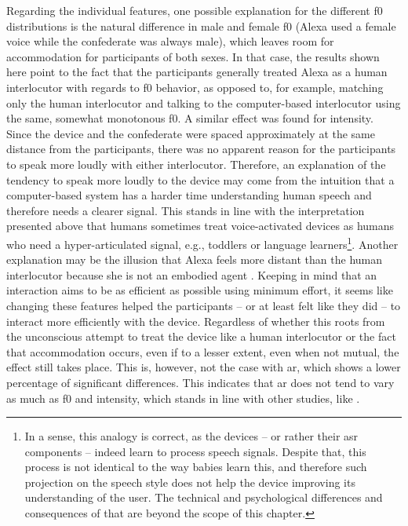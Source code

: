 Regarding the individual features, one possible explanation for the different \ac{f0} distributions is the natural difference in male and female \ac{f0} (Alexa used a female voice while the confederate was always male), which leaves room for accommodation for participants of both sexes.
In that case, the results shown here point to the fact that the participants generally treated Alexa as a human interlocutor with regards to \ac{f0} behavior, as opposed to, for example, matching only the human interlocutor and talking to the computer-based interlocutor using the same, somewhat monotonous \ac{f0}.
A similar effect was found for intensity.
Since the device and the confederate were spaced approximately at the same distance from the participants, there was no apparent reason for the participants to speak more loudly with either interlocutor.
Therefore, an explanation of the tendency to speak more loudly to the device may come from the intuition that a computer-based system has a harder time understanding human speech and therefore needs a clearer signal.
This stands in line with the interpretation presented above that humans sometimes treat voice-activated devices as humans who need a hyper-articulated signal, e.g., toddlers or language learners\footnote{In a sense, this analogy is correct, as the devices -- or rather their \ac{asr} components -- indeed learn to process speech signals.
Despite that, this process is not identical to the way babies learn this, and therefore such projection on the speech style does not help the device improving its understanding of the user.
The technical and psychological differences and consequences of that are beyond the scope of this chapter.}.
Another explanation may be the illusion that Alexa feels more distant than the human interlocutor because she is not an embodied agent \citep[cf.][and see \cref{sec:types_of_sdss} for further details]{Staum2010virtually, Gijssels2016speech}.
Keeping in mind that an interaction aims to be as efficient as possible using minimum effort, it seems like changing these features helped the participants -- or at least felt like they did -- to interact more efficiently with the device.
Regardless of whether this roots from the unconscious attempt to treat the device like a human interlocutor or the fact that accommodation occurs, even if to a lesser extent, even when not mutual, the effect still takes place.
This is, however, not the case with \ac{ar}, which shows a lower percentage of significant differences.
This indicates that \ac{ar} does not tend to vary as much as \ac{f0} and intensity, which stands in line with other studies, like \citet{Schweitzer2013convergence}.
